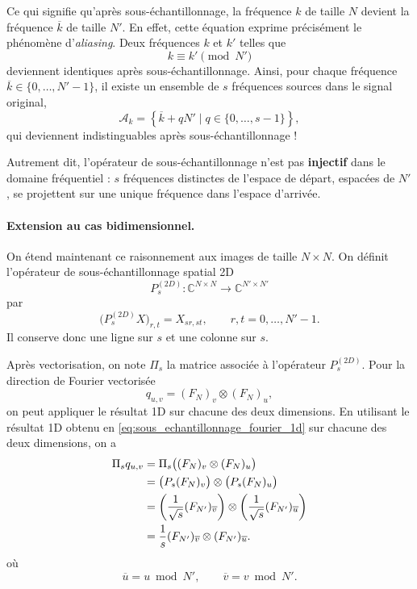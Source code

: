 Ce qui signifie qu'après sous-échantillonnage, la fréquence $k$ de taille $N$ devient la fréquence $\overline{k}$ de taille $N'$.
En effet, cette équation exprime précisément le phénomène d'\textit{aliasing}. Deux fréquences $k$ et $k'$
telles que
\[
    k \equiv k' \pmod{N'}
\]
deviennent identiques après sous-échantillonnage.
Ainsi, pour chaque fréquence $\overline{k} \in \{0,\dots,N'-1\}$, il existe un ensemble de $s$ fréquences sources
dans le signal original,
\[
    \mathcal{A}_k
    =
    \left\{ \overline{k} + qN' \mid q \in \{0,\dots,s-1\} \right\},
\]
qui deviennent indistinguables après sous-échantillonnage !

Autrement dit, l'opérateur de sous-échantillonnage n'est pas \textbf{injectif} dans le domaine fréquentiel : 
$s$ fréquences distinctes de l'espace de départ, espacées de $N'$, se projettent sur une unique fréquence dans 
l'espace d'arrivée.

\paragraph{Extension au cas bidimensionnel.}

On étend maintenant ce raisonnement aux images de taille $N \times N$. On définit l'opérateur de
sous-échantillonnage spatial 2D
\[
    P_s^{(2D)} : \mathbb{C}^{N \times N} \longrightarrow \mathbb{C}^{N' \times N'}
\]
par
\begin{equation}
    \big(P_s^{(2D)}X\big)_{r,t}
    =
    X_{sr,st},
    \qquad r,t = 0,\dots,N'-1.
    \label{eq:def_sous_echantillonnage_2d}
\end{equation}
Il conserve donc une ligne sur $s$ et une colonne sur $s$.

Après vectorisation, on note $\Pi_s$ la matrice associée à l'opérateur
$P_s^{(2D)}$. Pour la direction de Fourier vectorisée
\[
    q_{u,v}
    =
    (F_N)_v \otimes (F_N)_u,
\]
on peut appliquer le résultat 1D sur chacune des deux dimensions. En utilisant le résultat
1D obtenu en \eqref{eq:sous_echantillonnage_fourier_1d} sur chacune des deux dimensions, on a
\begin{align}
    \Pi_s q_{u,v}
    &=
    \Pi_s\big((F_N)_v \otimes (F_N)_u\big) \notag \\
    &=
    \big(P_s(F_N)_v\big) \otimes \big(P_s(F_N)_u\big) \notag \\
    &=
    \left(\frac{1}{\sqrt{s}}(F_{N'})_{\overline{v}}\right)
    \otimes
    \left(\frac{1}{\sqrt{s}}(F_{N'})_{\overline{u}}\right) \notag \\
    &=
    \frac{1}{s}
    (F_{N'})_{\overline{v}} \otimes (F_{N'})_{\overline{u}}.
    \label{eq:sous_echantillonnage_fourier_2d}
\end{align}
où
\[
    \overline{u} = u \bmod N',
    \qquad
    \overline{v} = v \bmod N'.
\]

